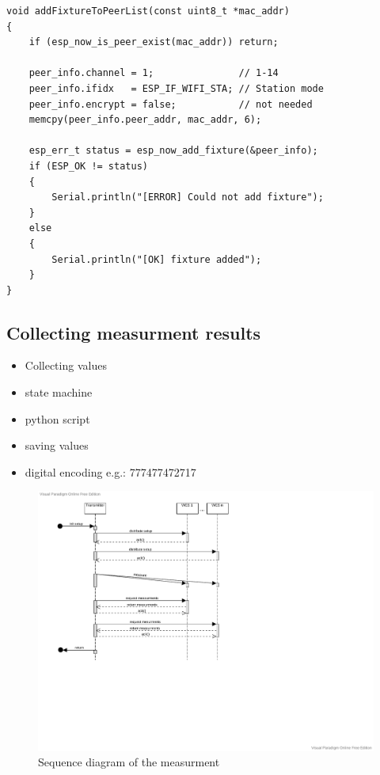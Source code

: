 \documentclass[]{ccs-thesis}
\begin{document}
\label{lst:shorttable}
\begin{lstlisting}
void addFixtureToPeerList(const uint8_t *mac_addr) 
{
	if (esp_now_is_peer_exist(mac_addr)) return;

	peer_info.channel = 1;               // 1-14
	peer_info.ifidx   = ESP_IF_WIFI_STA; // Station mode
	peer_info.encrypt = false;         	 // not needed
	memcpy(peer_info.peer_addr, mac_addr, 6);

	esp_err_t status = esp_now_add_fixture(&peer_info);
	if (ESP_OK != status) 
	{
		Serial.println("[ERROR] Could not add fixture");
	}
	else 
	{
		Serial.println("[OK] fixture added");
	}
}
\end{lstlisting}
% 


\subsection{Collecting measurment results}
\begin{itemize}
\item Collecting values
\item state machine
\item python script
\item saving values
\item digital encoding e.g.: 777477472717
\end{itemize}

\begin{figure}
	\includegraphics[scale=0.8]{figures/sequence_diagram.pdf}
	\caption{Sequence diagram of the measurment}
	\label{fig:sequenceDiagram}
\end{figure}
\end{document}

